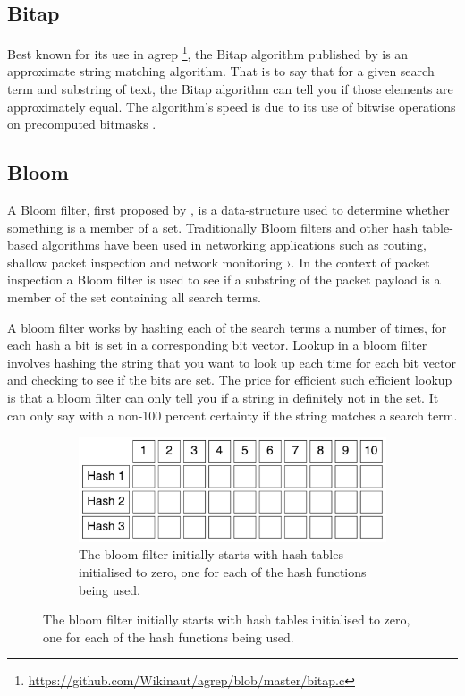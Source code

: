 \documentclass{article}
\begin{document}
\subsection{Bitap} \label{sec:bitap}

Best known for its use in agrep \citep{Wu1992}\footnote{\url{https://github.com/Wikinaut/agrep/blob/master/bitap.c}}, the Bitap algorithm published by \cite{Baeza1992} is an approximate string matching algorithm. That is to say that for a given search term and substring of text, the Bitap algorithm can tell you if those elements are approximately equal. The algorithm's speed is due to its use of bitwise operations on precomputed bitmasks .

\subsection{Bloom} \label{sec:bloom}

A Bloom filter, first proposed by \cite{Bloom1970}, is a data-structure used to determine whether something is a member of a set. Traditionally Bloom filters and other hash table-based algorithms have been used in networking applications such as routing, shallow packet inspection and network monitoring \citep{Song2005}›. In the context of packet inspection a Bloom filter is used to see if a substring of the packet payload is a member of the set containing all search terms.

A bloom filter works by hashing each of the search terms a number of times, for each hash a bit is set in a corresponding bit vector. Lookup in a bloom filter involves hashing the string that you want to look up each time for each bit vector and checking to see if the bits are set. The price for efficient such efficient lookup is that a bloom filter can only tell you if a string in definitely not in the set. It can only say with a non-100 percent certainty if the string matches a search term.

\begin{figure}[h!bt]
  \label{bloom-1}
  \centering
  
  \begin{subfigure}{\textwidth}
  \makeatletter
  \includegraphics[width=\textwidth]{images/bloom-1}
  \caption{The bloom filter initially starts with hash tables initialised to zero, one for each of the hash functions being used.}
  \end{subfigure}
\end{figure} 
\end{document}

